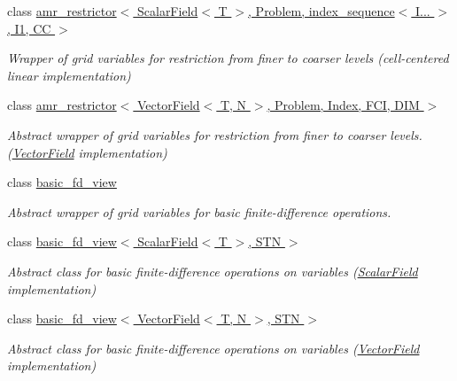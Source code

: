 \begin{DoxyCompactItemize}
class \hyperlink{classUintah_1_1PhaseField_1_1detail_1_1amr__restrictor_3_01ScalarField_3_01T_01_4_00_01Problem_0778720acc9a55f696b8537356a4dbcae}{amr\+\_\+restrictor$<$ Scalar\+Field$<$ T $>$, Problem, index\+\_\+sequence$<$ I... $>$, I1, C\+C $>$}
\begin{DoxyCompactList}\small\item\em Wrapper of grid variables for restriction from finer to coarser levels (cell-\/centered linear implementation) \end{DoxyCompactList}\item 
class \hyperlink{classUintah_1_1PhaseField_1_1detail_1_1amr__restrictor_3_01VectorField_3_01T_00_01N_01_4_00_01Pre7f2e99a4fbf25ff00717d25c8580b1a}{amr\+\_\+restrictor$<$ Vector\+Field$<$ T, N $>$, Problem, Index, F\+C\+I, D\+I\+M $>$}
\begin{DoxyCompactList}\small\item\em Abstract wrapper of grid variables for restriction from finer to coarser levels. (\hyperlink{structUintah_1_1PhaseField_1_1VectorField}{Vector\+Field} implementation) \end{DoxyCompactList}\item 
class \hyperlink{classUintah_1_1PhaseField_1_1detail_1_1basic__fd__view}{basic\+\_\+fd\+\_\+view}
\begin{DoxyCompactList}\small\item\em Abstract wrapper of grid variables for basic finite-\/difference operations. \end{DoxyCompactList}\item 
class \hyperlink{classUintah_1_1PhaseField_1_1detail_1_1basic__fd__view_3_01ScalarField_3_01T_01_4_00_01STN_01_4}{basic\+\_\+fd\+\_\+view$<$ Scalar\+Field$<$ T $>$, S\+T\+N $>$}
\begin{DoxyCompactList}\small\item\em Abstract class for basic finite-\/difference operations on variables (\hyperlink{structUintah_1_1PhaseField_1_1ScalarField}{Scalar\+Field} implementation) \end{DoxyCompactList}\item 
class \hyperlink{classUintah_1_1PhaseField_1_1detail_1_1basic__fd__view_3_01VectorField_3_01T_00_01N_01_4_00_01STN_01_4}{basic\+\_\+fd\+\_\+view$<$ Vector\+Field$<$ T, N $>$, S\+T\+N $>$}
\begin{DoxyCompactList}\small\item\em Abstract class for basic finite-\/difference operations on variables (\hyperlink{structUintah_1_1PhaseField_1_1VectorField}{Vector\+Field} implementation) \end{DoxyCompactList}\item 

\end{DoxyCompactItemize}
